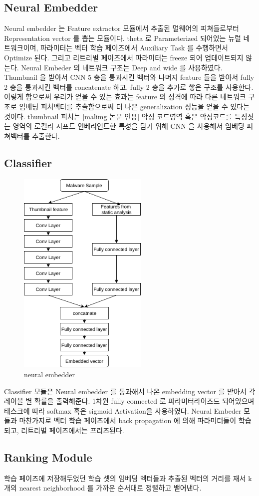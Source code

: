 \subsection{Neural Embedder}
Neural embedder 는 Feature extractor 모듈에서 추출된 멀웨어의 피쳐들로부터 Representation vector 를 뽑는 모듈이다. theta 로 Parameterized 되어있는 뉴럴 네트워크이며, 파라미터는 벡터 학습 페이즈에서 Auxiliary Task 를 수행하면서 Optimize 된다. 그리고 리트리벌 페이즈에서 파라미터는 freeze 되어 업데이트되지 않는다. 
Neural Embeder 의 네트워크 구조는 Deep and wide 를 사용하였다. Thumbnail 을 받아서 CNN 5 층을 통과시킨 벡터와 나머지 feature 들을 받아서 fully 2 층을 통과시킨 벡터를 concatenate 하고, fully 2 층을 추가로 쌓은 구조를 사용한다. 이렇게 함으로써 우리가 얻을 수 있는 효과는 feature 의 성격에 따라 다른 네트워크 구조로 임베딩 피쳐벡터를 추출함으로써 더 나은 generalization 성능을 얻을 수 있다는 것이다. thumbnail 피쳐는 [malimg 논문 인용] 악성 코드영역 혹은 악성코드를 특징짓는 영역의 로컬리 시프트 인베리언트한 특성을 담기 위해 CNN 을 사용해서 임베딩 피쳐벡터를 추출한다. 


\subsection{Classifier}
\begin{figure}
  \includegraphics[height=10cm]{../figures/neural_embedder.png}
  \caption{neural embedder}
  \label{fig:three}
\end{figure}

Classifier 모듈은 Neural embedder 를 통과해서 나온 embedding vector 를 받아서 각 레이블 별 확률을 출력해준다. 1차원 fully connected 로 파라미터라이즈드 되어있으며 태스크에 따라 softmax 혹은 sigmoid Activation을 사용하였다. Neural Embeder 모듈과 마찬가지로 벡터 학습 페이즈에서 back propagation 에 의해 파라미터들이 학습되고, 리트리벌 페이즈에서는 프리즈된다. 


\subsection{Ranking Module}
학습 페이즈에 저장해두었던 학습 셋의 임베딩 벡터들과 추출된 벡터의 거리를 재서 k 개의 nearest neighborhood 를 가까운 순서대로 정렬하고 뱉어낸다.


